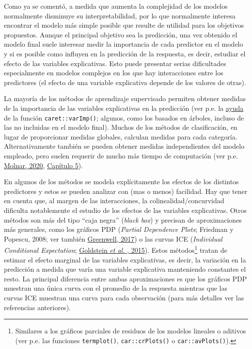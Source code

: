\documentclass[]{book}
\theoremstyle{break}
\theoremstyle{definition}
\theoremstyle{definition}
\theoremstyle{definition}
\theoremstyle{remark}
\begin{document}
Como ya se comentó, a medida que aumenta la complejidad de los modelos
normalmente disminuye su interpretabilidad, por lo que normalmente
interesa encontrar el modelo más simple posible que resulte de utilidad
para los objetivos propuestos. Aunque el principal objetivo sea la
predicción, una vez obtenido el modelo final suele interesar medir la
importancia de cada predictor en el modelo y si es posible como influyen
en la predicción de la respuesta, es decir, estudiar el efecto de las
variables explicativas. Esto puede presentar serias dificultades
especialmente en modelos complejos en los que hay interacciones entre
los predictores (el efecto de una variable explicativa depende de los
valores de otras).

La mayoría de los métodos de aprendizaje supervisado permiten obtener
medidas de la importancia de las variables explicativas en la predicción
(ver p.e. la
\href{https://topepo.github.io/caret/variable-importance.html}{ayuda} de
la función \texttt{caret::varImp()}; algunos, como los basados en
árboles, incluso de las no incluidas en el modelo final). Muchos de los
métodos de clasificación, en lugar de proporcionar medidas globales,
calculan medidas para cada categoría. Alternativamente también se pueden
obtener medidas independientes del modelo empleado, pero suelen requerir
de mucho más tiempo de computación (ver p.e.
\href{https://christophm.github.io/interpretable-ml-book}{Molnar, 2020},
\href{https://christophm.github.io/interpretable-ml-book/agnostic.htm}{Capítulo
5}).

En algunos de los métodos se modela explícitamente los efectos de los
distintos predictores y estos se pueden analizar con (mas o menos)
facilidad. Hay que tener en cuenta que, al margen de las interacciones,
la colinealidad/concurvidad dificulta notablemente el estudio de los
efectos de las variables explicativas. Otros métodos son más del tipo
``caja negra'' (\emph{black box}) y precisan de aproximaciones más
generales, como los gráficos PDP (\emph{Partial Dependence Plots};
Friedman y Popescu, 2008; ver también
\href{https://journal.r-project.org/archive/2017/RJ-2017-016/index.html}{Greenwell,
2017}) o las curvas ICE (\emph{Individual Conditional Expectation};
\href{https://doi.org/10.1080/10618600.2014.907095}{Goldstein \emph{et
al.} , 2015}). Estos métodos\footnote{Similares a los gráficos parciales
  de residuos de los modelos lineales o aditivos (ver p.e. las funciones
  \texttt{termplot()}, \texttt{car::crPlots()} o
  \texttt{car::avPlots()}).} tratan de estimar el efecto marginal de las
variables explicativas, es decir, la variación en la predicción a medida
que varía una variable explicativa manteniendo constantes el resto. La
principal diferencia entre ambas aproximaciones es que los gráficos PDP
muestran una única curva con el promedio de la respuesta mientras que
las curvas ICE muestran una curva para cada observación (para más
detalles ver las referencias anteriores).
\end{document}
